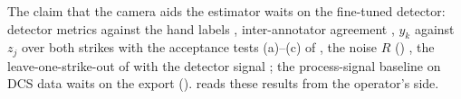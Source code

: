 The claim that the camera aids the estimator waits on the fine-tuned detector: detector metrics against the hand
labels , inter-annotator agreement , $y_k$ against $z_j$ over both
strikes with the acceptance tests (a)--(c) of  , the noise $R$ () , the leave-one-strike-out of  with the detector signal ; the process-signal baseline on DCS data waits on the export
().  reads these results from the operator's side.
